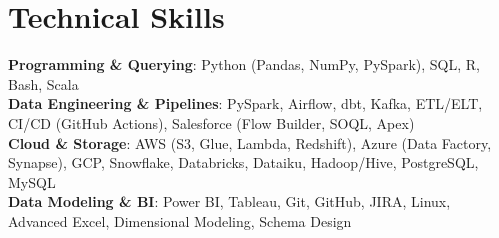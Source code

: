 \documentclass[letterpaper,10pt]{article}
\begin{document}
\section{Technical Skills}
 \begin{itemize}[leftmargin=0.15in, label={}]
    \small{\item{
     \textbf{Programming \& Querying}{: Python (Pandas, NumPy, PySpark), SQL, R, Bash, Scala} \\
     \textbf{Data Engineering \& Pipelines}{: PySpark, Airflow, dbt, Kafka, ETL/ELT, CI/CD (GitHub Actions), Salesforce (Flow Builder, SOQL, Apex)} \\
     \textbf{Cloud \& Storage}{: AWS (S3, Glue, Lambda, Redshift), Azure (Data Factory, Synapse), GCP, Snowflake, Databricks, Dataiku, Hadoop/Hive, PostgreSQL, MySQL} \\
     \textbf{Data Modeling \& BI}{: Power BI, Tableau, Git, GitHub, JIRA, Linux, Advanced Excel, Dimensional Modeling, Schema Design}
    }}
 \end{itemize}
\end{document}
